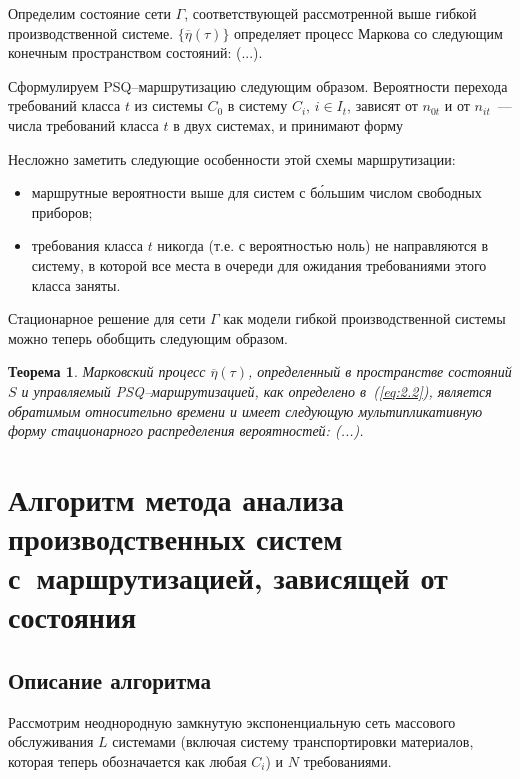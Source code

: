 \documentclass[a4paper,14pt]{extarticle}
\theoremstyle{note}
\newtheorem{theorem}{Теорема}
\begin{document}
Определим состояние сети $\Gamma$, соответствующей рассмотренной выше гибкой производственной системе. $\{ \overline{\eta}(\tau) \}$ определяет процесс Маркова со следующим конечным пространством состояний: (...).

Сформулируем PSQ--маршрутизацию следующим образом. Вероятности перехода требований класса $t$ из системы $C_0$ в систему $C_i$, $i \in I_t$, зависят от $n_{0t}$ и от $n_{it}$~--- числа требований класса $t$ в двух системах, и принимают форму

Несложно заметить следующие особенности этой схемы маршрутизации:
\begin{itemize}
\item маршрутные вероятности выше для систем с б\'{о}льшим числом свободных приборов;
\item требования класса $t$ никогда (т.е. с вероятностью ноль) не направляются в систему, в которой все места в очереди для ожидания требованиями этого класса заняты.
\end{itemize}

Стационарное решение для сети $\Gamma$ как модели гибкой производственной системы можно теперь обобщить следующим образом.

\begin{theorem}
 Марковский процесс $\overline{\eta}(\tau)$, определенный в пространстве состояний $S$ и управляемый PSQ--маршрутизацией, как определено в~(\ref{eq:2.2}), является обратимым относительно времени и имеет следующую мультипликативную форму стационарного распределения вероятностей: (...).
\end{theorem}




\section{Алгоритм метода анализа производственных систем с~маршрутизацией, зависящей от состояния}
\label{sec:algorithm}

\subsection{Описание алгоритма}
\label{subsec:algorithm_description}

Рассмотрим неоднородную замкнутую экспоненциальную сеть массового обслуживания $L$ системами (включая систему транспортировки материалов, которая теперь обозначается как любая $C_i$) и $N$ требованиями.
\end{document}
